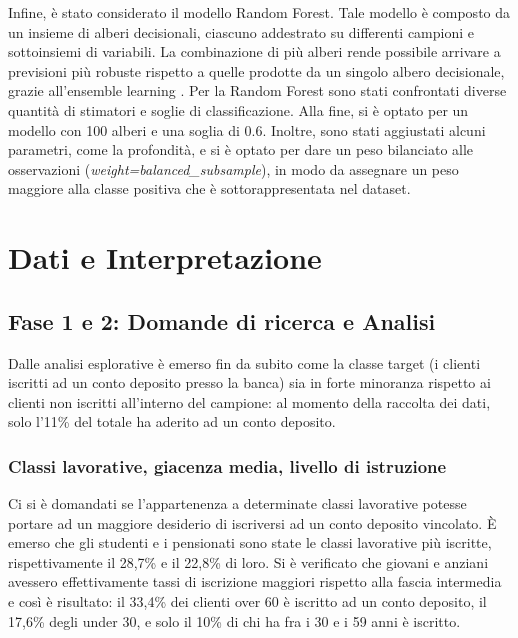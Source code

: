 \documentclass[11,5pt, a4paper]{article}
\begin{document}
Infine, è stato considerato il modello Random Forest. Tale modello è composto da un insieme di alberi decisionali, ciascuno addestrato su differenti campioni e sottoinsiemi di variabili. La combinazione di più alberi rende possibile arrivare a previsioni più robuste rispetto a quelle prodotte da un singolo albero decisionale, grazie all'ensemble learning \citep{RF_IBM}.
Per la Random Forest sono stati confrontati diverse quantità di stimatori e soglie di classificazione. Alla fine, si è optato per un modello con 100 alberi e una soglia di 0.6. Inoltre, sono stati aggiustati alcuni parametri, come la profondità, e si è optato per dare un peso bilanciato alle osservazioni (\textit{weight=balanced\_subsample}), in modo da assegnare un peso maggiore alla classe positiva che è sottorappresentata nel dataset.

\section{Dati e Interpretazione}
\subsection{Fase 1 e 2: Domande di ricerca e Analisi}
Dalle analisi esplorative è emerso fin da subito come la classe target (i clienti iscritti ad un conto deposito presso la banca) sia in forte minoranza rispetto ai clienti non iscritti all'interno del campione: al momento della raccolta dei dati, solo l’11\% del totale ha aderito ad un conto deposito. 

\subsubsection{Classi lavorative, giacenza media, livello di istruzione}

Ci si è domandati se l'appartenenza a determinate classi lavorative potesse portare ad un maggiore desiderio di iscriversi ad un conto deposito vincolato.
È emerso che gli studenti e i pensionati sono state le classi lavorative più iscritte, rispettivamente il 28,7\% e il 22,8\% di loro. Si è verificato che giovani e anziani avessero effettivamente tassi di iscrizione maggiori rispetto alla fascia intermedia e così è risultato: il 33,4\% dei clienti over 60 è iscritto ad un conto deposito, il 17,6\% degli under 30, e solo il 10\% di chi ha fra i 30 e i 59 anni è iscritto.
\end{document}
